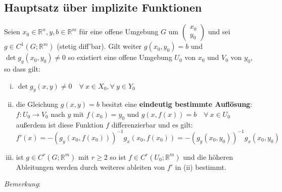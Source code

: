 \documentclass[11pt,a4paper]{book}
\newcommand {\Rn}	{\mathbb{R}^n}
\newcommand {\Rm}	{\mathbb{R}^m}
\newcommand{\1}    	{\mathbbm{1}}
\newcommand{\Bemerkung}	{\noindent\textit{Bemerkung}: }
\begin{document}
\subsection{Hauptsatz über implizite Funktionen}
Seien \(x_0 \in \Rn, y,b \in \Rm\) für eine offene Umgebung \(G\) um \(\left( \begin{array}{c}
	x_0 \\ y_0
\end{array} \right)\) und sei \(g \in C^1(G;\Rm)\) (stetig diff'bar). Gilt weiter \(g(x_0,y_0) = b\) und \(\det g_y(x_0,y_0) \neq 0\) so existiert eine offene Umgebung \(U_0\) von \(x_0\) und \(V_0\) von \(y_0\), so dass gilt:
\begin{enumerate}[(i)]
	\item \(\det g_y(x,y) \neq 0 \quad \forall~ x \in X_0, \forall~ y \in Y_0\)
	\item die Gleichung \(g(x,y) = b\) besitzt eine \textbf{eindeutig bestimmte Auflösung}: \\
	\(f: U_0 \rightarrow V_0\) nach \(y\) mit \(f(x_0) = y_0\) und \(g(x,f(x)) = b \quad \forall~ x \in U_0\)\\
	außerdem ist diese Funktion \(f\) differenzierbar und es gilt: \\
	\(f'(x) = -\left( g_y\left( x_0, f(x_0) \right) \right)^{-1} g_x\left( x_0, f(x_0) \right) = -\left( g_y\left( x_0, y_0 \right) \right)^{-1} g_x\left( x_0, y_0 \right) \)
	\item ist \(g \in C^r(G;\Rm)\) mit \(r \geqslant 2\) so ist \(f \in C^r(U_0;\Rm)\) und die höheren Ableitungen werden durch weiteres ableiten von \(f'\) in (ii) bestimmt.
\end{enumerate}
\Bemerkung
\end{document}
